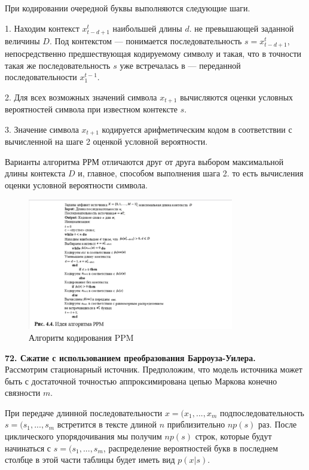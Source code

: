 \documentclass[14pt]{article}
\begin{document}
При кодировании очередной буквы выполняются следующие шаги.

1. Находим контекст \(x_{t-d+1}^{t}\) наибольшей длины \(d\). не превышающей заданной величины \(D\). Под контекстом — понимается последовательность \(s = x_{t-d+1}^{t}\), непосредственно предшествующая кодируемому символу и такая, что в точности такая же последовательность \(s\) уже встречалась в — переданной последовательности \(x_1^{t-1}\).

2. Для всех возможных значений символа \(x_{t+1}\) вычисляются оценки условных вероятностей символа при известном контексте \(s\).

3. Значение символа \(x_{t+1}\) кодируется арифметическим кодом в соответствии с вычисленной на шаге 2 оценкой условной вероятности.

Варианты алгоритма РРМ отличаются друг от друга выбором максимальной длины контекста \(D\) и, главное, способом выполнения шага 2. то есть вычисления оценки условной вероятности символа.

\begin{figure}[h!]
\centering
    \includegraphics[width=90mm]{ppm_alg.png}
\caption{Алгоритм кодирования PPM}
\end{figure}

\bigskip
\textbf{72. Сжатие с использованием преобразования Барроуза-Уилера.} \\

Рассмотрим стационарный источник. Предположим, что модель источника может быть с достаточной точностью аппроксимирована цепью Маркова конечно связности \(m\).

При передаче длинной последовательности \(x = (x_1, ..., x_m\) подпоследовательность \(s = (s_1, ..., s_m\) встретится в тексте длиной \(n\) приблизительно \(np(s)\) раз. После циклического упорядочивания мы получим \(np(s)\) строк, которые будут начинаться с \(s = (s_1, ..., s_m\), распределение вероятностей букв в последнем столбце в этой части таблицы будет иметь вид \(p(x|s)\).
\end{document}
